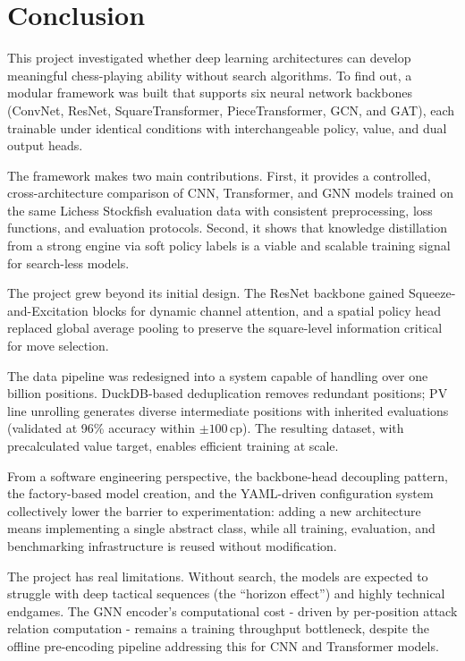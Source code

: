 \chapter{Conclusion}

This project investigated whether deep learning architectures can develop meaningful chess-playing ability without search algorithms. To find out, a modular framework was built that supports six neural network backbones (ConvNet, ResNet, SquareTransformer, PieceTransformer, GCN, and GAT), each trainable under identical conditions with interchangeable policy, value, and dual output heads.

The framework makes two main contributions. First, it provides a controlled, cross-architecture comparison of CNN, Transformer, and GNN models trained on the same Lichess Stockfish evaluation data with consistent preprocessing, loss functions, and evaluation protocols. Second, it shows that knowledge distillation from a strong engine via soft policy labels is a viable and scalable training signal for search-less models.


The project grew beyond its initial design. The ResNet backbone gained Squeeze-and-Excitation blocks for dynamic channel attention, and a spatial policy head replaced global average pooling to preserve the square-level information critical for move selection. 

The data pipeline was redesigned into a system capable of handling over one billion positions. DuckDB-based deduplication removes redundant positions; PV line unrolling generates diverse intermediate positions with inherited evaluations (validated at 96\% accuracy within $\pm 100$\,cp). The resulting dataset, with precalculated value target, enables efficient training at scale.

From a software engineering perspective, the backbone-head decoupling pattern, the factory-based model creation, and the YAML-driven configuration system collectively lower the barrier to experimentation: adding a new architecture means implementing a single abstract class, while all training, evaluation, and benchmarking infrastructure is reused without modification.

The project has real limitations. Without search, the models are expected to struggle with deep tactical sequences (the ``horizon effect'') and highly technical endgames. The GNN encoder's computational cost - driven by per-position attack relation computation - remains a training throughput bottleneck, despite the offline pre-encoding pipeline addressing this for CNN and Transformer models.

